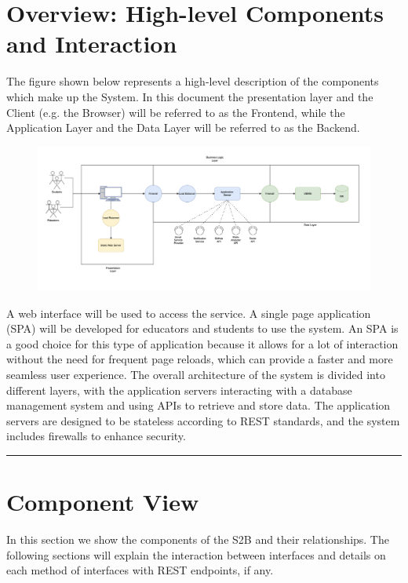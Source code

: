 \documentclass{Configuration_Files/Template}
\begin{document}
\section{Overview: High-level Components and Interaction}

The figure shown below represents a high-level description of the components which make up the System. In this document the presentation layer and the Client (e.g. the Browser) will be referred to as the Frontend, while the Application Layer and the Data Layer will be referred to as the Backend.

\begin{figure}[H]
\centering
\includegraphics[scale = 0.5]{DD_latex/Images/diagrams/overview.png}\\
\end{figure}


A web interface will be used to access the service. A single page application (SPA) will be developed for educators and students to use the system. An SPA is a good choice for this type of application because it allows for a lot of interaction without the need for frequent page reloads, which can provide a faster and more seamless user experience. The overall architecture of the system is divided into different layers, with the application servers interacting with a database management system and using APIs to retrieve and store data. The application servers are designed to be stateless according to REST standards, and the system includes firewalls to enhance security.

{\color{bluepoli}\rule{\linewidth}{0.1pt}}

\section{Component View}

In this section we show the components of the S2B and their relationships. The following sections will explain the interaction between interfaces and details on each method of interfaces with REST endpoints, if any.
\end{document}
